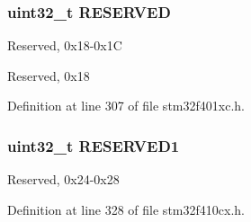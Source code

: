 \subsubsection[{\texorpdfstring{R\+E\+S\+E\+R\+V\+ED}{RESERVED}}]{\setlength{\rightskip}{0pt plus 5cm}uint32\+\_\+t R\+E\+S\+E\+R\+V\+ED}\hypertarget{struct_s_y_s_c_f_g___type_def_a896190d6ac50dc6d53ff0c0c2520a4ad}{}\label{struct_s_y_s_c_f_g___type_def_a896190d6ac50dc6d53ff0c0c2520a4ad}
Reserved, 0x18-\/0x1C

Reserved, 0x18 

Definition at line 307 of file stm32f401xc.\+h.

\subsubsection[{\texorpdfstring{R\+E\+S\+E\+R\+V\+E\+D1}{RESERVED1}}]{\setlength{\rightskip}{0pt plus 5cm}uint32\+\_\+t R\+E\+S\+E\+R\+V\+E\+D1}\hypertarget{struct_s_y_s_c_f_g___type_def_a3c50f8698052818ea3024b4b52d65886}{}\label{struct_s_y_s_c_f_g___type_def_a3c50f8698052818ea3024b4b52d65886}
Reserved, 0x24-\/0x28 

Definition at line 328 of file stm32f410cx.\+h.



